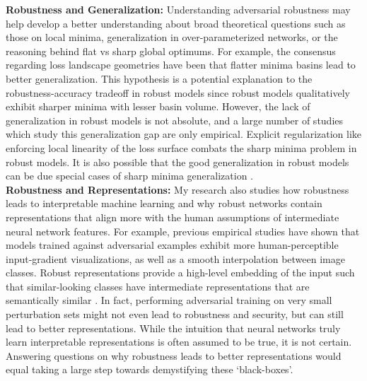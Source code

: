\documentclass[12pt]{article}
\begin{document}
\textbf{Robustness and Generalization:} Understanding adversarial robustness may help develop a better understanding about broad theoretical questions such as those on local minima, generalization in over-parameterized networks, or the reasoning behind flat vs sharp global optimums. For example, the consensus regarding loss landscape geometries have been that flatter minima basins lead to better generalization. This hypothesis is a potential explanation to the robustness-accuracy tradeoff in robust models \cite{tsipras2018robustness} since robust models qualitatively exhibit sharper minima with lesser basin volume. 
However, the lack of generalization in robust models is not absolute, and a large number of studies which study this generalization gap are only empirical. Explicit regularization like enforcing local linearity of the loss surface combats the sharp minima problem in robust models. It is also possible that the good generalization in robust models can be due special cases of sharp minima generalization \cite{10.5555/3305381.3305487}.\\

\textbf{Robustness and Representations:} My research also studies how robustness leads to interpretable machine learning and why robust networks contain representations that align more with the human assumptions of intermediate neural network features. For example, previous empirical studies have shown that models trained against adversarial examples exhibit more human-perceptible input-gradient visualizations, as well as a smooth interpolation between image classes. Robust representations provide a high-level embedding of the input such that similar-looking classes have intermediate representations that are semantically similar \cite{engstrom2019adversarial}. In fact, performing adversarial training on very small perturbation sets might not even lead to robustness and security, but can still lead to better representations. While the intuition that neural networks truly learn interpretable representations is often assumed to be true, it is not certain. Answering questions on why robustness leads to better representations would equal taking a large step towards demystifying these `black-boxes'. \\

\end{document}
